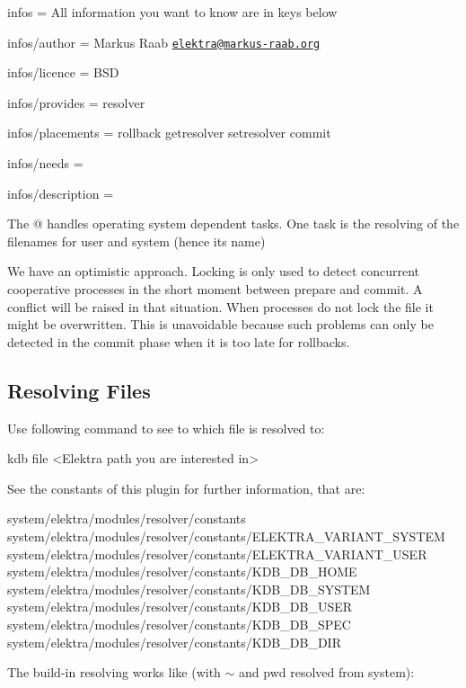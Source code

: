 
\begin{DoxyItemize}
\item infos = All information you want to know are in keys below
\item infos/author = Markus Raab \href{mailto:elektra@markus-raab.org}{\tt elektra@markus-\/raab.\+org}
\item infos/licence = B\+S\+D
\item infos/provides = resolver
\item infos/placements = rollback getresolver setresolver commit
\item infos/needs =
\item infos/description = 
\end{DoxyItemize}

The @ handles operating system dependent tasks. One task is the resolving of the filenames for user and system (hence its name)

We have an optimistic approach. Locking is only used to detect concurrent cooperative processes in the short moment between prepare and commit. A conflict will be raised in that situation. When processes do not lock the file it might be overwritten. This is unavoidable because such problems can only be detected in the commit phase when it is too late for rollbacks.

\subsection*{Resolving Files}

Use following command to see to which file is resolved to\+: \begin{DoxyVerb}kdb file <Elektra path you are interested in>
\end{DoxyVerb}


See the constants of this plugin for further information, that are\+: \begin{DoxyVerb}system/elektra/modules/resolver/constants
system/elektra/modules/resolver/constants/ELEKTRA_VARIANT_SYSTEM
system/elektra/modules/resolver/constants/ELEKTRA_VARIANT_USER
system/elektra/modules/resolver/constants/KDB_DB_HOME
system/elektra/modules/resolver/constants/KDB_DB_SYSTEM
system/elektra/modules/resolver/constants/KDB_DB_USER
system/elektra/modules/resolver/constants/KDB_DB_SPEC
system/elektra/modules/resolver/constants/KDB_DB_DIR
\end{DoxyVerb}


The build-\/in resolving works like (with $\sim$ and {\ttfamily pwd} resolved from system)\+:



